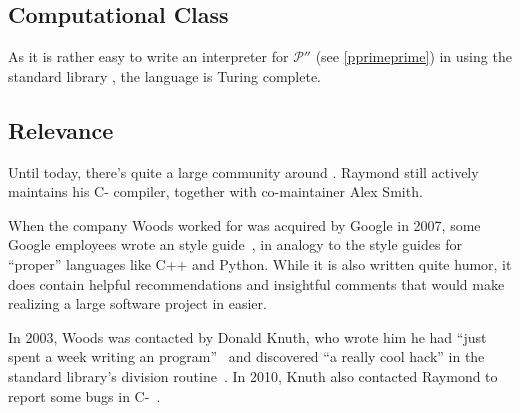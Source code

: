 \subsection{Computational Class}

As it is rather easy to write an interpreter for $\mathcal{P}''$ (see \cref{pprimeprime}) in \ic{} using the standard library \cite{alksentrs2008intercal}, the language is Turing complete.

\subsection{Relevance}

Until today, there's quite a large community around \ic{}. Raymond still actively maintains his C-\ic{} compiler, together with co-maintainer Alex Smith.

When the company Woods worked for was acquired by Google in 2007, some Google employees wrote an \ic{} style guide~\cite{raiter2007google}, in analogy to the style guides for “proper” languages like C++ and Python. While it is also written quite humor, it does contain helpful recommendations and insightful comments that would make realizing a large software project in \ic{} easier.

In 2003, Woods was contacted by Donald Knuth, who wrote him he had “just spent a week writing an \ic{} program”~\cite{knuth2003tpk} and discovered “a really cool hack” in the standard library's division routine~\cite{hamilton2008az}. In 2010, Knuth also contacted Raymond to report some bugs in C-\ic{}~\cite{raymond2010donald}.

